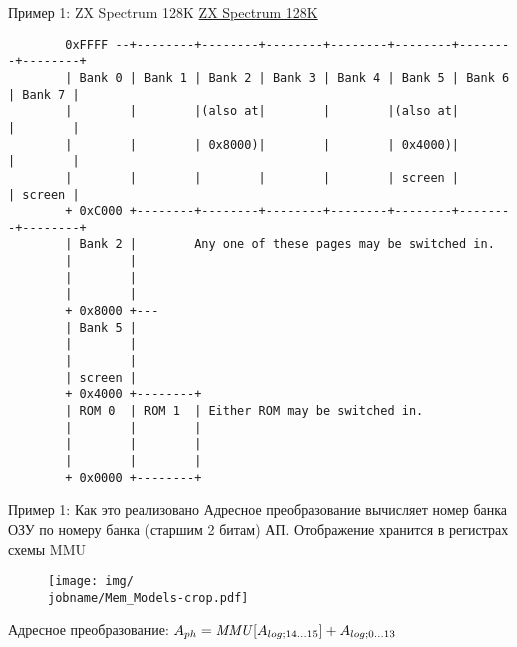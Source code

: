 \documentclass[xetex,aspectratio=43]{beamer}
\begin{document}
\begin{frame}[fragile]{Пример 1: ZX Spectrum 128K}
    \href{http://www.worldofspectrum.org/faq/reference/128kreference.htm}{ZX
        Spectrum 128K}

    { \scriptsize \begin{verbatim}
        0xFFFF --+--------+--------+--------+--------+--------+--------+--------+
        | Bank 0 | Bank 1 | Bank 2 | Bank 3 | Bank 4 | Bank 5 | Bank 6 | Bank 7 |
        |        |        |(also at|        |        |(also at|        |        |
        |        |        | 0x8000)|        |        | 0x4000)|        |        |
        |        |        |        |        |        | screen |        | screen |
        + 0xC000 +--------+--------+--------+--------+--------+--------+--------+
        | Bank 2 |        Any one of these pages may be switched in.
        |        |
        |        |
        |        |
        + 0x8000 +---
        | Bank 5 |
        |        |
        |        |
        | screen |
        + 0x4000 +--------+
        | ROM 0  | ROM 1  | Either ROM may be switched in.
        |        |        |
        |        |        |
        |        |        |
        + 0x0000 +--------+
    \end{verbatim} }
\end{frame}

\begin{frame}{Пример 1: Как это реализовано}
    Адресное преобразование вычисляет номер банка ОЗУ по номеру банка
    (старшим 2 битам) АП. Отображение хранится в регистрах схемы MMU

    \begin{figure}
        \texttt{[image: img/\\jobname/Mem\_Models-crop.pdf]}
    \end{figure}

    Адресное преобразование:
    \(A_{ph} = \mathit{MMU}[A_{log\\; 14\ldots 15}] + A_{log\\; 0\dots 13}\)
\end{frame}
\end{document}
